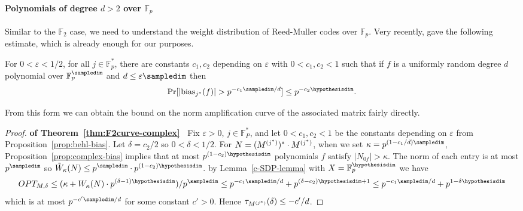 \paragraph{Polynomials of degree $d>2$ over $\mathbb{F}_p$}
Similar to the $\mathbb{F}_2$ case,
we need to understand
the weight distribution of Reed-Muller codes over $\mathbb{F}_p$.
Very recently,
\cite{bogy:reedmuller-bias} gave the following estimate,
which is already enough for our purposes.

\begin{proposition}
\label{prop:complex-bias}
For $0<\varepsilon<1/2$,
for all $j\in \mathbb{F}_p^*$,
there are constants $c_1, c_2$ depending on $\varepsilon$ with $0<c_1,c_2<1$ such that if $f$ is a uniformly random degree $d$ polynomial over
$\mathbb{F}^\sampledim_p$ and $d\le \varepsilon \sampledim$ then 
$$\Pr[|\biasjs(f)|>p^{-c_1 \sampledim/d}]\le p^{-c_2 \hypothesisdim}.$$
\end{proposition}

From this form we can obtain the bound on the norm amplification curve
of the associated matrix fairly directly.
\medskip

\begin{proof}{\bfseries\upshape of Theorem~\ref{thm:F2curve-complex}\ }
Fix $\varepsilon>0$, $j\in \mathbb{F}_P^*$,
and let $0<c_1, c_2<1$ be the constants depending on
$\varepsilon$ from Proposition~\ref{prop:behl-bias}.
Let $\delta=c_2/2$ so $0<\delta<1/2$.
For $N=(M^{(j^*)})^*\cdot M^{(j^*)}$,
when we set $\kappa=p^{(1-c_1/d)\sampledim}$,  Proposition~\ref{prop:complex-bias} implies that at
most $p^{(1-c_2)\hypothesisdim}$ 
polynomials $f$ satisfy $|N_{0f}|>\kappa$.
The norm of each entry is at most $p^\sampledim$ so 
$\tilde W_\kappa(N)\le p^\sampledim\cdot p^{(1-c_2)\hypothesisdim}$.
by Lemma~\ref{c-SDP-lemma} with 
$X=\mathbb{F}_p^\hypothesisdim$ we have
$$OPT_{M,\delta}\le (\kappa+W_\kappa(N)\cdot p^{(\delta-1)\hypothesisdim})/p^\sampledim
\le p^{-c_1 \sampledim/d}+p^{(\delta - c_2)\hypothesisdim+1}\le p^{-c_1 \sampledim/d}+p^{1-\delta \hypothesisdim}$$
which is at most $p^{-c' \sampledim/d}$ for some constant $c'>0$. 
Hence $\tau_{M^{(j^*)}}(\delta)\le -c'/d$.
\end{proof}

